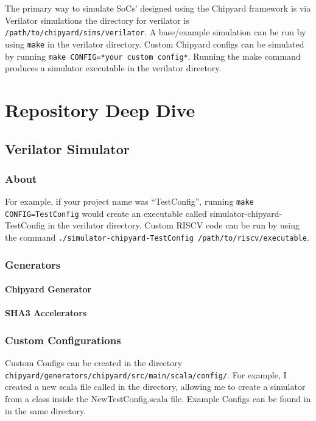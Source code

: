The primary way to simulate SoCs' designed using the Chipyard framework is via Verilator simulations the directory for verilator is \texttt{/path/to/chipyard/sims/verilator}.
A base/example simulation can be run by using \texttt{make} in the verilator directory.
Custom Chipyard configs can be simulated by running \texttt{make CONFIG=*your custom config*}.
Running the make command produces a simulator executable in the verilator directory.
\chapter{Repository Deep Dive}\label{chap:Repository_Deep_Dive}
\section{Verilator Simulator}\label{sec:Verilator_Simulator}
\subsection{About}\label{sec:About_Verilator_Simulator}
For example, if your project name was ``TestConfig'', running \texttt{make CONFIG=TestConfig} would create an executable called simulator-chipyard-TestConfig in the verilator directory.
Custom RISCV code can be run by using the command \texttt{./simulator-chipyard-TestConfig /path/to/riscv/executable}.

\subsection{Generators}\label{sec:Generators}
\subsubsection{Chipyard Generator}\label{sec:Chipyard_Generator}
\subsubsection{SHA3 Accelerators}\label{sec:SHA3_Accelerators_Generator}

\subsection{Custom Configurations}\label{sec:Custom_Configurations}
Custom Configs can be created in the directory \texttt{chipyard/generators/chipyard/src/main/scala/config/}.
For example, I created a new scala file called  in the directory, allowing me to create a simulator from a class inside the NewTestConfig.scala file.
Example Configs can be found in   in the same directory.

